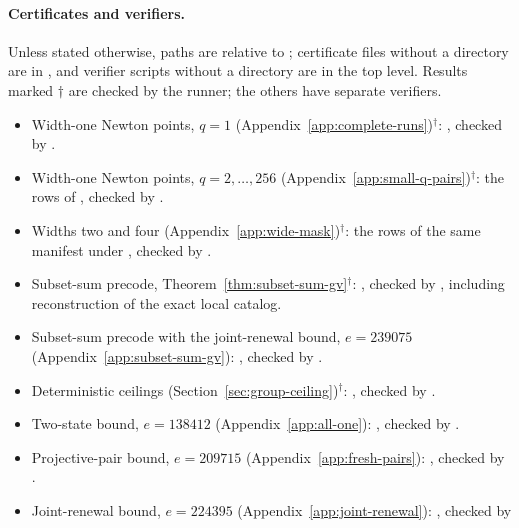\paragraph{Certificates and verifiers.}
Unless stated otherwise, paths are relative to
; certificate files without a
directory are in , and verifier scripts without a
directory are in the top level. Results marked $\dagger$ are checked by
the runner; the others have separate verifiers.
\begin{itemize}
\item Width-one Newton points, $q=1$ (Appendix~\ref{app:complete-runs})$^\dagger$:
  , checked by
  .
\item Width-one Newton points, $q=2,\ldots,256$
  (Appendix~\ref{app:small-q-pairs})$^\dagger$: the rows of
  , checked by
  .
\item Widths two and four (Appendix~\ref{app:wide-mask})$^\dagger$:
  the rows of the same manifest under
  , checked by
  .
\item Subset-sum precode, Theorem~\ref{thm:subset-sum-gv}$^\dagger$:
  , checked by
  , including reconstruction of
  the exact local catalog.
\item Subset-sum precode with the joint-renewal bound,
  $e=239075$ (Appendix~\ref{app:subset-sum-gv}):
  , checked by
  .
\item Deterministic ceilings (Section~\ref{sec:group-ceiling})$^\dagger$:
  , checked by
  .
\item Two-state bound, $e=138412$ (Appendix~\ref{app:all-one}):
  ,
  checked by .
\item Projective-pair bound, $e=209715$ (Appendix~\ref{app:fresh-pairs}):
  , checked by
  .
\item Joint-renewal bound, $e=224395$ (Appendix~\ref{app:joint-renewal}):
  , checked by

\end{itemize}
